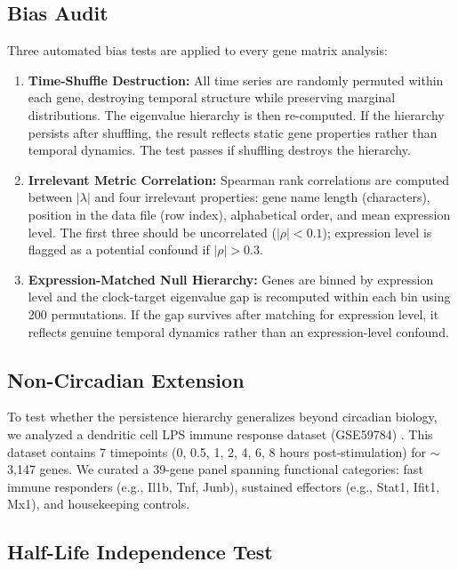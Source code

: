 \documentclass[11pt,letterpaper]{article}
\begin{document}
\subsection{Bias Audit}
\label{sec:bias-methods}

Three automated bias tests are applied to every gene matrix analysis:

\begin{enumerate}
\item \textbf{Time-Shuffle Destruction:} All time series are randomly permuted within each gene, destroying temporal structure while preserving marginal distributions. The eigenvalue hierarchy is then re-computed. If the hierarchy persists after shuffling, the result reflects static gene properties rather than temporal dynamics. The test passes if shuffling destroys the hierarchy.

\item \textbf{Irrelevant Metric Correlation:} Spearman rank correlations are computed between $|\lambda|$ and four irrelevant properties: gene name length (characters), position in the data file (row index), alphabetical order, and mean expression level. The first three should be uncorrelated ($|\rho| < 0.1$); expression level is flagged as a potential confound if $|\rho| > 0.3$.

\item \textbf{Expression-Matched Null Hierarchy:} Genes are binned by expression level and the clock-target eigenvalue gap is recomputed within each bin using 200 permutations. If the gap survives after matching for expression level, it reflects genuine temporal dynamics rather than an expression-level confound.
\end{enumerate}

\subsection{Non-Circadian Extension}
\label{sec:noncircadian-methods}

To test whether the persistence hierarchy generalizes beyond circadian biology, we analyzed a dendritic cell LPS immune response dataset (GSE59784) \citep{rabani2011metabolic}. This dataset contains 7 timepoints (0, 0.5, 1, 2, 4, 6, 8 hours post-stimulation) for $\sim$3,147 genes. We curated a 39-gene panel spanning functional categories: fast immune responders (e.g., Il1b, Tnf, Junb), sustained effectors (e.g., Stat1, Ifit1, Mx1), and housekeeping controls.

\subsection{Half-Life Independence Test}
\label{sec:halflife-methods}
\end{document}
